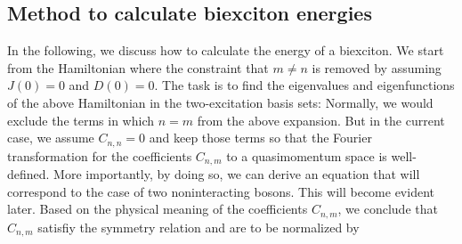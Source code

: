 \subsection{Method to calculate biexciton energies}
\label{subsec:biexcitonEnergy}
In the following, we discuss how to calculate the energy of a biexciton. We start from the Hamiltonian
where the constraint that $m\neq n$ is removed by assuming $J(0) = 0$ and $D(0) = 0$. The task is to find   the 
eigenvalues and eigenfunctions of the above Hamiltonian  in the
 two-excitation basis sets:
Normally, we would exclude the terms in which $n = m$ from the above expansion. But in the current case, we assume
 $C_{n,n}=0$ and keep those terms so that the Fourier transformation for the coefficients $C_{n, m}$ to a
 quasimomentum space
 is well-defined. More importantly, by doing so, we can derive an equation that will correspond to the case of two
 noninteracting bosons. This will become evident later. Based on the physical meaning of the coefficients $C_{n,m}$,
 we conclude that $C_{n,m}$ satisfiy the symmetry relation
and are to be normalized by

